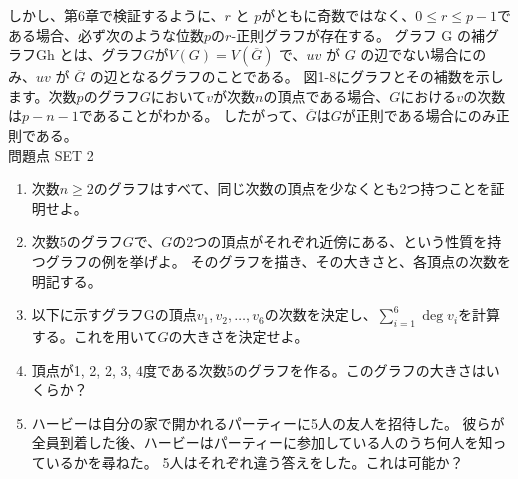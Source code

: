 
しかし、第6章で検証するように、$r$ と $p$がともに奇数ではなく、$0 \leq  r \leq  p-1$である場合、必ず次のような位数$p$の$r$-正則グラフが存在する。
グラフ G の補グラフGh とは、グラフ$G$が$V(G) = V(\overline{G})$ で、$uv$ が $G$ の辺でない場合にのみ、$uv$ が $\overline{G}$ の辺となるグラフのことである。
図1-8にグラフとその補数を示します。次数$p$のグラフ$G$において$v$が次数$n$の頂点である場合、$G$における$v$の次数は$p-n-1$であることがわかる。
したがって、$\overline{G}$は$G$が正則である場合にのみ正則である。
\\

問題点 SET 2

\begin{enumerate}
  \item 次数$n \geq 2$のグラフはすべて、同じ次数の頂点を少なくとも2つ持つことを証明せよ。
  \item 次数5のグラフ$G$で、$G$の2つの頂点がそれぞれ近傍にある、という性質を持つグラフの例を挙げよ。
        そのグラフを描き、その大きさと、各頂点の次数を明記する。
  \item 以下に示すグラフGの頂点$v_1, v_2, \ldots, v_6$の次数を決定し、$\sum_{i=1}^{6} \deg v_i$を計算する。これを用いて$G$の大きさを決定せよ。
  \item 頂点が1, 2, 2, 3, 4度である次数5のグラフを作る。このグラフの大きさはいくらか？
  \item ハービーは自分の家で開かれるパーティーに5人の友人を招待した。
  彼らが全員到着した後、ハービーはパーティーに参加している人のうち何人を知っているかを尋ねた。
  5人はそれぞれ違う答えをした。これは可能か？
\end{enumerate}